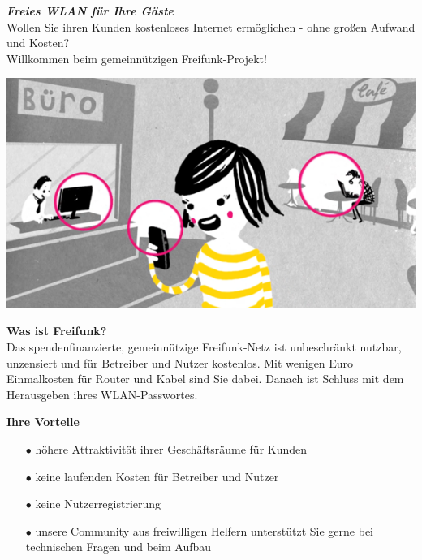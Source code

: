 \documentclass[a4paper]{article}
\begin{document}
\thispagestyle{empty}

\begin{center}
  \Huge \textit{\textbf{\textcolor{freifunkpink}{Freies WLAN für Ihre Gäste}}} \\
  \vspace{0.6cm}
  \large Wollen Sie ihren Kunden kostenloses Internet ermöglichen - ohne großen Aufwand und Kosten?\\
  Willkommen beim gemeinnützigen Freifunk-Projekt!\\
  \normalsize

  \vspace{1.25cm}
  \hspace*{-0.05 \paperwidth}\includegraphics[width=\paperwidth]{../images/city_center}
\end{center}

\vspace{0.6cm}

\begin{Row}
  \begin{Cell}{1}
    \textbf{Was ist Freifunk?}\\
    Das spendenfinanzierte, gemeinnützige Freifunk-Netz ist unbeschränkt nutzbar, unzensiert und für Betreiber und Nutzer kostenlos. Mit wenigen Euro Einmalkosten für Router und Kabel sind Sie dabei. Danach ist Schluss mit dem Herausgeben ihres WLAN-Passwortes.
  \end{Cell}
  \begin{Cell}{1}
    \textbf{Ihre Vorteile} \vspace*{-0.18cm}
    \begin{itemize}
      \item[\textcolor{freifunkpink}{\Large$\bullet$}] höhere Attraktivität ihrer Geschäftsräume für Kunden
      \vspace*{-0.3cm}
      \item[\textcolor{freifunkpink}{\Large$\bullet$}] keine laufenden Kosten für Betreiber und Nutzer\vspace*{-0.3cm}
      \item[\textcolor{freifunkpink}{\Large$\bullet$}] keine Nutzerregistrierung
      \vspace*{-0.3cm}
      \item[\textcolor{freifunkpink}{\Large$\bullet$}] unsere Community aus freiwilligen Helfern unterstützt Sie gerne bei technischen Fragen und beim Aufbau
    \end{itemize}
  \end{Cell}
\end{Row}
\end{document}

